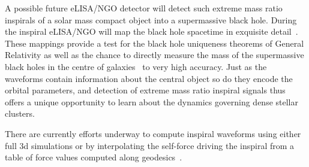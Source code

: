 \documentclass[12pt]{article}
\newcommand{\lisa}{eLISA/NGO}
\begin{document}
A possible future \lisa{} detector will detect such extreme mass ratio
inspirals of a solar mass compact object into a supermassive black hole.
During the
inspiral \lisa{} will
map the black hole spacetime
in exquisite detail~\cite{AmaroSeoane:2012je}. 
These mappings provide a test for the
black hole uniqueness theorems of General Relativity as well as the chance to
directly measure the mass of the supermassive black holes in the
centre of galaxies~\cite{AmaroSeoane:2012je} to very high accuracy.
Just as the
waveforms contain information about the central object so do they encode the
orbital parameters, and detection of extreme mass ratio inspiral signals thus offers
a unique opportunity to learn about the dynamics governing dense stellar
clusters. 


%
There are currently efforts underway to compute
inspiral waveforms using either full 3d simulations or by interpolating the
self-force driving the inspiral from a
table of force values computed along
geodesics~\cite{Diener:2011cc, Warburton:2011fk}.



\end{document}
